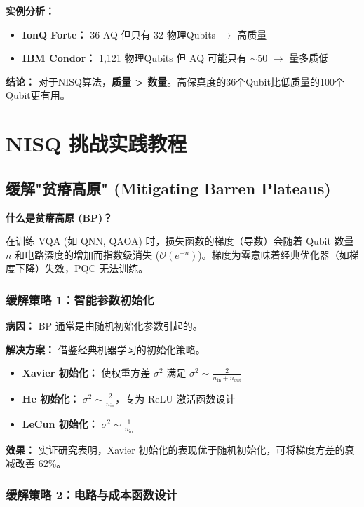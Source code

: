 \documentclass[11pt,a4paper]{article}
\begin{document}
\textbf{实例分析：}
\begin{itemize}
\item \textbf{IonQ Forte：} 36 AQ 但只有 32 物理Qubits $\rightarrow$ 高质量
\item \textbf{IBM Condor：} 1,121 物理Qubits 但 AQ 可能只有 $\sim$50 $\rightarrow$ 量多质低
\end{itemize}

\textbf{结论：} 对于NISQ算法，\textbf{质量 > 数量}。高保真度的36个Qubit比低质量的100个Qubit更有用。

\section{NISQ 挑战实践教程}

\subsection{缓解"贫瘠高原" (Mitigating Barren Plateaus)}

\textbf{什么是贫瘠高原 (BP)？}

在训练 VQA (如 QNN, QAOA) 时，损失函数的梯度（导数）会随着 Qubit 数量 $n$ 和电路深度的增加而指数级消失 ($\mathcal{O}(e^{-n})$)。梯度为零意味着经典优化器（如梯度下降）失效，PQC 无法训练。

\subsubsection{缓解策略 1：智能参数初始化}

\textbf{病因：} BP 通常是由随机初始化参数引起的。

\textbf{解决方案：} 借鉴经典机器学习的初始化策略。

\begin{itemize}
\item \textbf{Xavier 初始化：} 使权重方差 $\sigma^2$ 满足 $\sigma^2 \sim \frac{2}{n_{\text{in}} + n_{\text{out}}}$
\item \textbf{He 初始化：} $\sigma^2 \sim \frac{2}{n_{\text{in}}}$，专为 ReLU 激活函数设计
\item \textbf{LeCun 初始化：} $\sigma^2 \sim \frac{1}{n_{\text{in}}}$
\end{itemize}

\textbf{效果：} 实证研究表明，Xavier 初始化的表现优于随机初始化，可将梯度方差的衰减改善 62\%。

\subsubsection{缓解策略 2：电路与成本函数设计}
\end{document}
